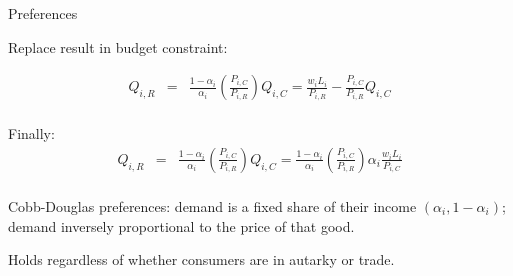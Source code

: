 \documentclass[notes,11pt, aspectratio=169, xcolor=table]{beamer}
\newenvironment{wideitemize}{\itemize\addtolength{\itemsep}{10pt}}{\enditemize}
\begin{document}
\begin{frame}{Preferences}
\begin{wideitemize}
        \item Replace result in budget constraint:

\scriptsize{
\begin{eqnarray*}
    Q_{i,R}&=& \frac{1-\alpha_i}{\alpha_i } \left( \frac{P_{i,C}}{P_{i,R}}\right) Q_{i,C}  = \frac{w_i L_i}{P_{i,R}} - \frac{P_{i,C}}{P_{i,R} } Q_{i,C} \\
\end{eqnarray*}
}

\normalsize
\begin{center}
\end{center}


\item Finally:
{\scriptsize
\begin{eqnarray*}
     Q_{i,R}  &=& \frac{1-\alpha_i}{\alpha_i } \left( \frac{P_{i,C}}{P_{i,R}}\right) Q_{i,C}  = \frac{1-\alpha_i}{\alpha_i } \left( \frac{P_{i,C}}{P_{i,R}}\right) \alpha_i  \frac{w_i L_i}{P_{i,C}} \\
\end{eqnarray*}
}

\begin{center}
\end{center}

\item Cobb-Douglas preferences: demand is a fixed share of their income $(\alpha_i, 1-\alpha_i)$; demand inversely proportional to the price of that good.
\item Holds regardless of whether consumers are in autarky or trade. 

\end{wideitemize}
\end{frame}
\end{document}
